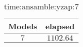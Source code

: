 \begin{table}[!ht]
	\centering
	\begin{tabular}{|c|c|}
		\hline
		Models & elapsed \\ \hline
		$7$ & $1102.64$ \\ \hline
	\end{tabular}
	\caption{time:ansamble:yzap:7}
	\label{tab:time:ansamble:yzap:7}
\end{table}
